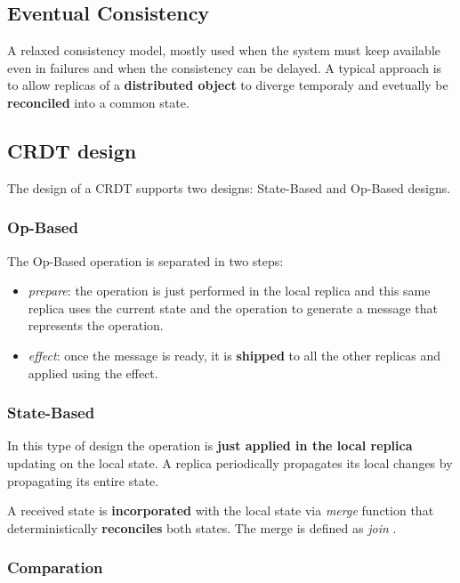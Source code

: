 \subsection{Eventual Consistency}

A relaxed consistency model, mostly used when the system must keep available even in failures and when the consistency can be delayed. A typical approach is to allow replicas of a \textbf{distributed object} to diverge temporaly and evetually be \textbf{reconciled} into a common state. 


\subsection{CRDT design}
The design of a CRDT supports two designs: State-Based and Op-Based designs. 

\subsubsection{Op-Based} 

The Op-Based operation is separated in two steps:
\begin{itemize}
    \item \textit{prepare}: the operation is just performed in the local replica and this same replica uses the current state and the operation to generate a message that represents the operation.
    \item \textit{effect}: once the message is ready, it is \textbf{shipped} to all the other replicas and applied using the effect. 
\end{itemize}

\subsubsection{State-Based}

In this type of design the operation is \textbf{just applied in the local replica} updating on the local state. A replica periodically propagates its local changes by propagating its entire state. 

A received state is \textbf{incorporated} with the local state via \textit{merge} function that deterministically \textbf{reconciles} both states. The merge is defined as \textit{join} . 

\subsubsection{Comparation}

